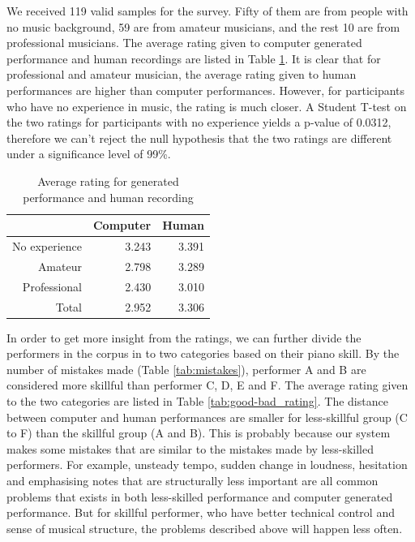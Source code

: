 

We received 119 valid samples for the survey. Fifty of them are from people with no music background, 59 are from amateur musicians, and the rest 10 are from professional musicians. The average rating given to computer generated performance and human recordings are listed in Table \ref{tab:avg_rating}. It is clear that for professional and amateur musician, the average rating given to human performances are higher than computer performances. However, for participants who have no experience in music, the rating is much closer. A Student T-test on the two ratings for participants with no experience yields a p-value of 0.0312, therefore we can't reject the null hypothesis that the two ratings are different under a significance level of 99\%.

\begin{table}
   \centering
   \caption{Average rating for generated performance and human recording}
   \label{tab:avg_rating}
   \begin{tabular}{r|rr}
      \hline
      &Computer &Human \\
      \hline
      No experience&3.243&3.391\\
      Amateur&2.798&3.289\\
      Professional&2.430&3.010\\
      \hline
      Total&2.952&3.306\\
      \hline
   \end{tabular}
\end{table}

In order to get more insight from the ratings, we can further divide the performers in the corpus in to two categories based on their piano skill. By the number of mistakes made (Table \ref{tab:mistakes}), performer A and B are considered more skillful than performer C, D, E and F. The average rating given to the two categories are listed in Table \ref{tab:good-bad_rating}. The distance between computer and human performances are smaller for less-skillful group (C to F) than the skillful group (A and B). This is probably because our system makes some mistakes that are similar to the mistakes made by less-skilled performers. For example, unsteady tempo, sudden change in loudness, hesitation and emphasising notes that are structurally less important are all common problems that exists in both less-skilled performance and computer generated performance. But for skillful performer, who have better technical control and sense of musical structure, the problems described above will happen less often. %

